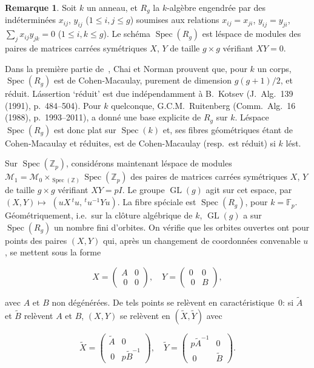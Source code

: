 \documentclass[11pt,a4paper]{article}
\theoremstyle{plain}
\theoremstyle{definition}
\newtheorem{remark}[theorem]{Remarque}
\DeclareMathOperator{\Spec}{Spec}
\DeclareMathOperator{\GL}{GL}
\begin{document}
\begin{remark}
Soit $k$ un anneau, et $R_g$ la $k$-alg\`ebre engendr\'ee par des
ind\'etermin\'ees $x_{ij}$, $y_{ij}$ ($1 \leq i, j \leq g$) soumises aux relations $x_{ij} = x_{ji}$, $y_{ij} = y_{ji}$,
$\sum_j x_{ij}y_{jk} = 0$ ($1 \leq i, k \leq g$). Le sch\'ema $\Spec(R_g)$ est l\'espace de modules des
paires de matrices carr\'ees sym\'etriques $X$, $Y$ de taille $g \times g$ v\'erifiant $XY = 0$.

Dans la premi\`ere partie de~\cite{ChaiNorman}, Chai et Norman prouvent que, pour $k$ un corps,
$\Spec(R_g)$ est de Cohen-Macaulay, purement de dimension $g(g+1)/2$, et r\'eduit.
L\'assertion `r\'eduit' est due ind\'ependamment \`a B.~Kotsev (J.~Alg.~139 (1991),
p.~484--504). Pour $k$ quelconque, G.C.M.~Ruitenberg (Comm.~Alg.~16 (1988),
p.~1993--2011), a donn\'e une base explicite de $R_g$ sur $k$. L\'espace $\Spec(R_g)$ est
donc plat sur $\Spec(k)$ et, ses fibres g\'eom\'etriques \'etant de Cohen-Macaulay et
r\'eduites, est de Cohen-Macaulay (resp.~est r\'eduit) si $k$ l\'est.

Sur $\Spec(\mathbb{Z}_p)$, consid\'erons maintenant l\'espace de modules $\mathscr{M}_1 =
\mathscr{M}_0 \times_{\Spec(\mathbb{Z})} \Spec(\mathbb{Z}_p)$ des paires de matrices carr\'ees sym\'etriques $X$, $Y$ de taille
$g \times g$ v\'erifiant $XY = pI$. Le groupe $\GL(g)$ agit sur cet espace, par $(X, Y) \mapsto$
$(uX\,\!^t u, \,\!^t u^{-1}Yu)$. La fibre sp\'eciale est $\Spec(R_g)$, pour $k = \mathbb{F}_p$. G\'eom\'etriquement,
i.e.~sur la cl\^oture alg\'ebrique de $k$, $\GL(g)$ a sur $\Spec(R_g)$ un nombre fini d'orbites.
On v\'erifie que les orbites ouvertes ont pour points des paires $(X, Y)$ qui, apr\`es
un changement de coordonn\'ees convenable $u$, se mettent sous la forme

\begin{equation}
X = \begin{pmatrix} A & 0 \\\ 0 & 0 \end{pmatrix}, \quad Y = \begin{pmatrix} 0 & 0 \\\ 0 & B \end{pmatrix},
\end{equation}

avec $A$ et $B$ non d\'eg\'en\'er\'ees. De tels points se rel\`event en caract\'eristique~0: si
$\tilde{A}$ et $\tilde{B}$ rel\`event $A$ et $B$, $(X, Y)$ se rel\`event en $(\tilde{X}, \tilde{Y})$ avec

\begin{equation}
\tilde{X} = \begin{pmatrix} \tilde{A} & 0 \\\ 0 & p\tilde{B}^{-1} \end{pmatrix}, \quad \tilde{Y} = \begin{pmatrix} p\tilde{A}^{-1} & 0 \\\ 0 & \tilde{B} \end{pmatrix}.
\end{equation}


\end{remark}
\end{document}
